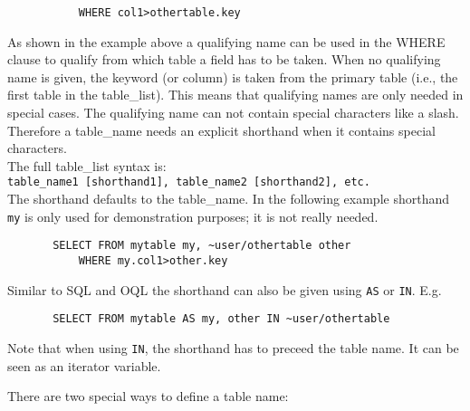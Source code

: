 \begin{description}
\begin{verbatim}
           WHERE col1>othertable.key
       \end{verbatim}
       As shown in the example above a qualifying name
       can be used in the WHERE
       clause to qualify from which table a field has to be taken.
       When no qualifying name is given, the keyword (or column) is taken
       from the primary table (i.e., the first table in the table\_list).
       This means that qualifying names are only needed in special cases.
       The qualifying name can not contain special characters like a slash.
       Therefore a table\_name needs an explicit shorthand when it contains
       special characters.
       \\The full table\_list syntax is:
       \\
       \texttt{table\_name1 [shorthand1], table\_name2 [shorthand2], etc.}
       \\The shorthand defaults to the table\_name.
       In the following example shorthand \texttt{my} is only used
       for demonstration purposes; it is not really needed.
       \begin{verbatim}
       SELECT FROM mytable my, ~user/othertable other
           WHERE my.col1>other.key
       \end{verbatim}
       Similar to SQL and OQL the shorthand can also be given using
       \texttt{AS} or \texttt{IN}. E.g.
       \begin{verbatim}
       SELECT FROM mytable AS my, other IN ~user/othertable
       \end{verbatim}
       Note that when using \texttt{IN}, the shorthand has to preceed
       the table name. It can be seen as an iterator variable.

       There are two special ways to define a table name:
       \begin{enumerate}
       

\end{enumerate}
\end{description}
